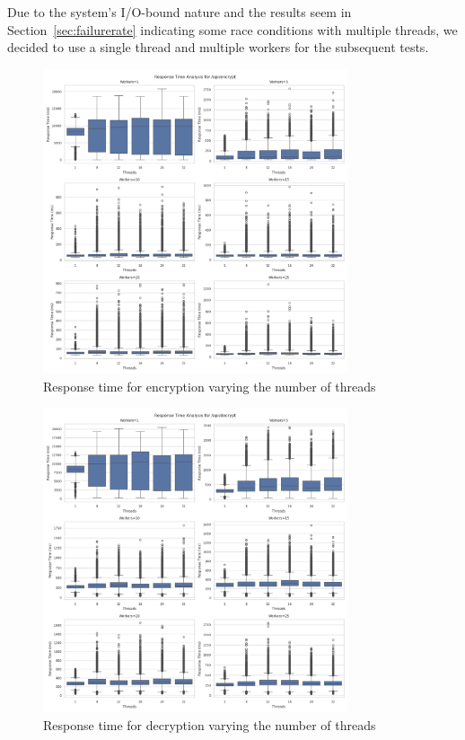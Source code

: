 \documentclass[cic,tc,english]{iiufrgs}
\begin{document}
            Due to the system's I/O-bound nature and the results seem in Section~\ref{sec:failurerate} indicating some race conditions with multiple threads, we decided to use a single thread and multiple workers for the subsequent tests.

            \begin{figure}
                \centering
                \includegraphics[width=0.8\textwidth]{images/phase1/api_encrypt/response_time_workers_summary.png}
                \caption{Response time for encryption varying the number of threads}
                \label{fig:encrypt_response_time_workers}
            \end{figure}

            \begin{figure}
                \centering
                \includegraphics[width=0.8\textwidth]{images/phase1/api_decrypt/response_time_workers_summary.png}
                \caption{Response time for decryption varying the number of threads}
                \label{fig:decrypt_response_time_workers}
            \end{figure}
\end{document}
